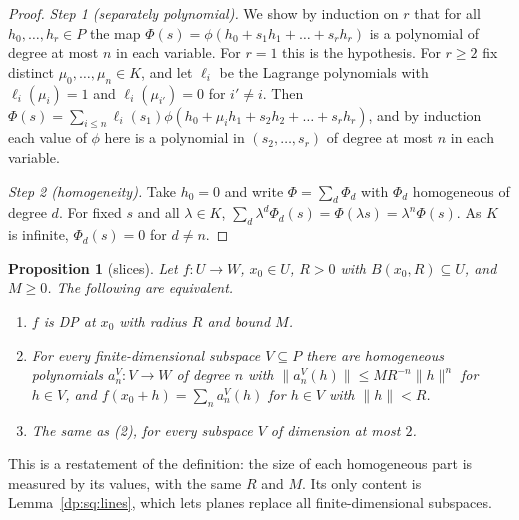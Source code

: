 \documentclass[11pt]{amsart}
\newtheorem{proposition}[theorem]{Proposition}
\theoremstyle{definition}
\theoremstyle{remark}
\numberwithin{equation}{section}
\newcommand{\norm}[1]{\lVert #1\rVert}
\theoremstyle{plain}
\theoremstyle{definition}
\theoremstyle{plain}
\begin{document}
\begin{proof}
\emph{Step 1 (separately polynomial).} We show by induction on $r$ that for all $h_0,\dots,h_r\in P$ the map $\Phi(s)=\phi(h_0+s_1h_1+\dots+s_rh_r)$ is a polynomial of degree at most $n$ in each variable. For $r=1$ this is the hypothesis. For $r\ge2$ fix distinct $\mu_0,\dots,\mu_n\in K$, and let $\ell_i$ be the Lagrange polynomials with $\ell_i(\mu_i)=1$ and $\ell_i(\mu_{i'})=0$ for $i'\ne i$. Then $\Phi(s)=\sum_{i\le n}\ell_i(s_1)\phi(h_0+\mu_ih_1+s_2h_2+\dots+s_rh_r)$, and by induction each value of $\phi$ here is a polynomial in $(s_2,\dots,s_r)$ of degree at most $n$ in each variable.

\emph{Step 2 (homogeneity).} Take $h_0=0$ and write $\Phi=\sum_d\Phi_d$ with $\Phi_d$ homogeneous of degree $d$. For fixed $s$ and all $\lambda\in K$, $\sum_d\lambda^d\Phi_d(s)=\Phi(\lambda s)=\lambda^n\Phi(s)$. As $K$ is infinite, $\Phi_d(s)=0$ for $d\ne n$.
\end{proof}

\begin{proposition}[slices]\label{dp:prop:slices}
Let $f\colon U\to W$, $x_0\in U$, $R>0$ with $B(x_0,R)\subseteq U$, and $M\ge0$. The following are equivalent.
\begin{enumerate}
\item $f$ is DP at $x_0$ with radius $R$ and bound $M$.
\item For every finite-dimensional subspace $V\subseteq P$ there are homogeneous polynomials $a_n^V\colon V\to W$ of degree $n$ with $\norm{a_n^V(h)}\le MR^{-n}\norm h^n$ for $h\in V$, and $f(x_0+h)=\sum_na_n^V(h)$ for $h\in V$ with $\norm h<R$.
\item The same as \textup{(2)}, for every subspace $V$ of dimension at most $2$.
\end{enumerate}
\end{proposition}

This is a restatement of the definition: the size of each homogeneous part is measured by its values, with the same $R$ and $M$. Its only content is Lemma~\ref{dp:sq:lines}, which lets planes replace all finite-dimensional subspaces.
\end{document}
